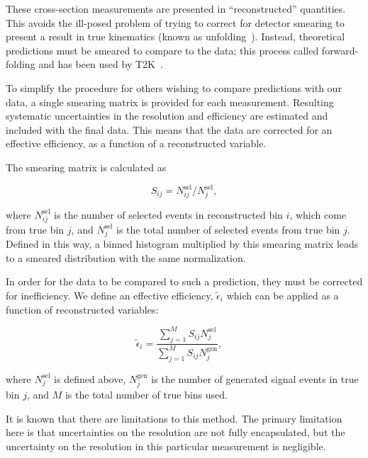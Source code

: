 
These cross-section measurements are presented in ``reconstructed'' quantities.  This avoids the ill-posed problem of trying to correct for detector smearing to present a result in true kinematics (known as unfolding~\cite{DAgostini:1994fjx}).
Instead, theoretical predictions must be smeared to compare to the data; this process called forward-folding and has been used by  T2K~\cite{Koch2019}.

To simplify the procedure for others wishing to compare predictions with our data, a single smearing matrix is provided for each measurement.  Resulting systematic uncertainties in the resolution and efficiency are estimated and included with the final data. This means that the data are corrected for an effective efficiency, as a function of a reconstructed variable.

The smearing matrix is calculated as

\begin{equation}
S_{ij} = N_{ij}^{\text{sel}} / N_{j}^{\text{sel}},
\end{equation}

\noindent
where $N_{ij}^{\text{sel}}$ is the number of selected events in reconstructed bin $i$, which come from true bin $j$, and $ N_{j}^{\text{sel}}$ is the total number of selected events from true bin $j$.
Defined in this way, a binned histogram multiplied by this smearing matrix leads to a smeared distribution with the same normalization.

In order for the data to be compared to such a prediction, they must be corrected for inefficiency.  We define an effective efficiency, $\tilde{\epsilon}_i$ which can be applied as a function of reconstructed variables:

\begin{equation}
\label{eq:eff_smear}
\tilde{\epsilon}_i = \frac{ \sum_{j=1}^{M} S_{ij}N^\text{sel}_j}{ \sum_{j=1}^{M} S_{ij}N^\text{gen}_j}, \quad 
\end{equation}

\noindent
where $N^\text{sel}_j$ is defined above, $N^\text{gen}_j$ is the number of generated signal events in true bin $j$, and $M$ is the total number of true bins used.

It is known that there are limitations to this method.  The primary limitation here is that uncertainties on the resolution are not fully encapsulated, but the uncertainty on the resolution in this particular measurement is negligible.

